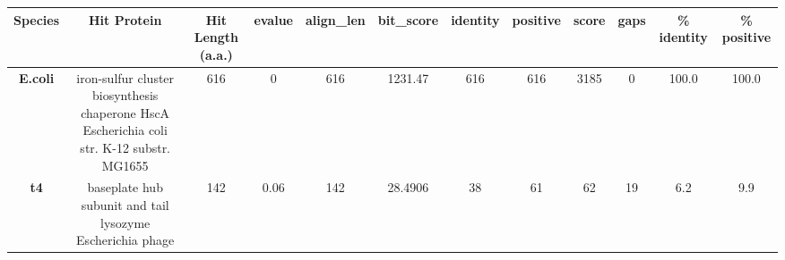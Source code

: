 \begin{tabular}{|c|c|c|c|c|c|c|c|c|c|c|c|} \hline
\textbf{Species} & \textbf{Hit Protein} & \textbf{Hit Length (a.a.)} & \textbf{evalue} & \textbf{align\_len} & \textbf{bit\_score} & \textbf{identity} & \textbf{positive} & \textbf{score} & \textbf{gaps} & \textbf{\% identity} & \textbf{\% positive} \\ \hline
\textbf{E.coli} & iron-sulfur cluster biosynthesis chaperone HscA Escherichia coli str. K-12 substr. MG1655 & 616 & 0 & 616 & 1231.47 & 616 & 616 & 3185 & 0 & 100.0 & 100.0\\
\textbf{t4} & baseplate hub subunit and tail lysozyme Escherichia phage  & 142 & 0.06 & 142 & 28.4906 & 38 & 61 & 62 & 19 & 6.2 & 9.9\\
\hline \end{tabular}
